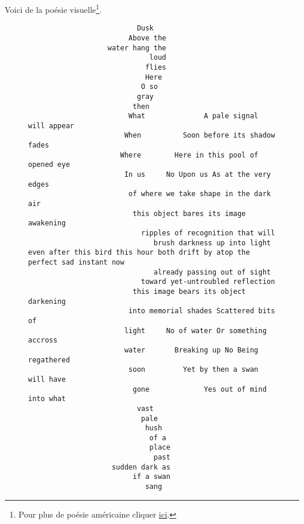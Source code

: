 Voici de la poésie visuelle\footnote{Pour plus de poésie
        américaine cliquer \href{https://amzn.to/2F96Hs0}{ici}.}.
\begin{center}
  \begin{figure}[h]
    \centering
    {\small
\begin{verbatim}
                          Dusk
                        Above the
                   water hang the
                             loud
                            flies
                            Here
                           O so
                          gray
                         then
                        What              A pale signal will appear
                       When          Soon before its shadow fades
                      Where        Here in this pool of opened eye
                       In us     No Upon us As at the very edges
                        of where we take shape in the dark air
                         this object bares its image awakening
                           ripples of recognition that will
                              brush darkness up into light
even after this bird this hour both drift by atop the perfect sad instant now
                              already passing out of sight
                           toward yet-untroubled reflection
                         this image bears its object darkening
                        into memorial shades Scattered bits of
                       light     No of water Or something accross
                       water       Breaking up No Being regathered
                        soon         Yet by then a swan will have 
                         gone             Yes out of mind into what
                          vast 
                           pale
                            hush
                             of a 
                             place 
                              past 
                    sudden dark as
                         if a swan
                            sang
\end{verbatim}
      }

    \caption[]{\href{https://emacs.stackexchange.com/questions/18011/poem-in-org-mode-verse-environment-mangled-by-latex-export}{}}
    \label{fig:swan}
  \end{figure}
\end{center}

\newpage


